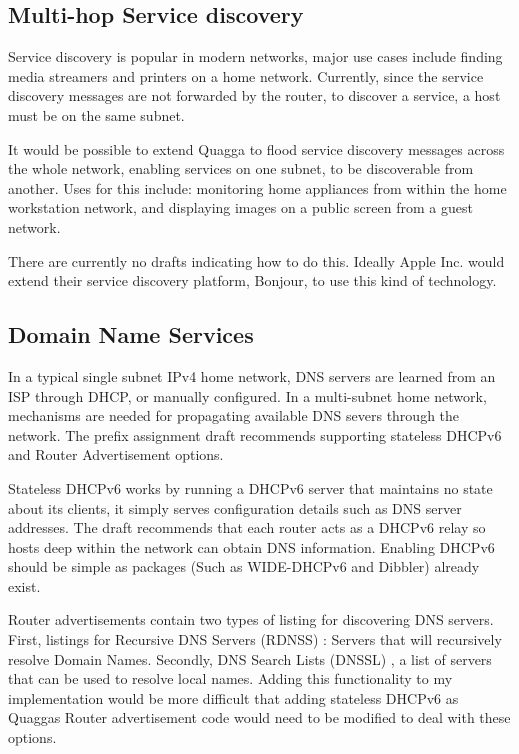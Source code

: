 \subsection{Multi-hop Service discovery}
Service discovery is popular in modern networks, major use cases include
finding media streamers and printers on a home network. Currently, since the
service discovery messages are not forwarded by the router, to discover a
service, a host must be on the same subnet.

It would be possible to extend Quagga to flood service discovery
messages across the whole network, enabling services on one subnet, to be
discoverable from another. Uses for this include: monitoring home appliances from
within the home workstation network, and displaying images on a public screen
from a guest network.

There are currently no drafts indicating how to do this. Ideally Apple Inc.\@
would extend their service discovery platform, Bonjour, to use this kind of
technology.

\subsection{Domain Name Services}
In a typical single subnet IPv4 home network, DNS servers are learned from an
ISP through DHCP, or manually configured. In a multi-subnet home network,
mechanisms are needed for propagating available DNS severs through the network.
The prefix assignment draft recommends supporting stateless DHCPv6 and Router
Advertisement options.

Stateless DHCPv6 works by running a DHCPv6 server that maintains no state about
its clients, it simply serves configuration details such as DNS server
addresses. The draft recommends that each router acts as a DHCPv6 relay so
hosts deep within the network can obtain DNS information.  Enabling DHCPv6
should be simple as packages (Such as WIDE-DHCPv6 and Dibbler) already exist. 

Router advertisements contain two types of listing for discovering DNS servers.
First, listings for Recursive DNS Servers (RDNSS)
: Servers that will recursively
resolve Domain Names. Secondly, DNS Search Lists (DNSSL)
, a list of servers that can be used to
resolve local names. Adding this functionality to my implementation would be
more difficult that adding stateless DHCPv6 as Quaggas Router advertisement
code would need to be modified to deal with these options.

